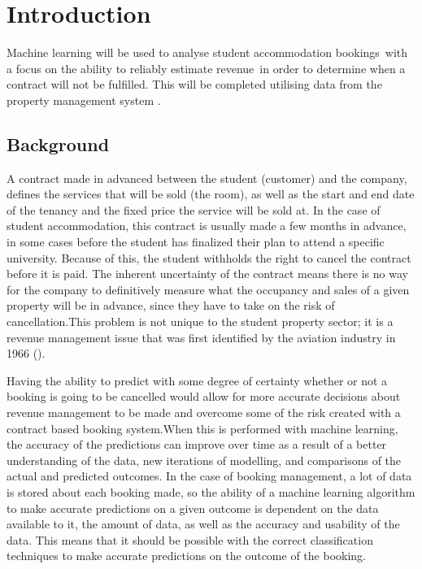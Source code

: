 \chapter{Introduction}

Machine learning will be used to analyse student accommodation bookings with a focus on the ability to reliably estimate revenue in order to determine when a contract will not be fulfilled. This will be completed utilising data from the property management system \cite{Jain2006IntellectualPerspective}.

\section{Background}

A contract made in advanced between the student (customer) and the company, defines the services that will be sold (the room), as well as the start and end date of the tenancy and the fixed price the service will be sold at. In the case of student accommodation, this contract is usually made a few months in advance, in some cases before the student has finalized their plan to attend a specific university. Because of this, the student withholds the right to cancel the contract before it is paid. The inherent uncertainty of the contract means there is no way for the company to definitively measure what the occupancy and sales of a given property will be in advance, since they have to take on the risk of cancellation.This problem is not unique to the student property sector; it is a revenue management issue that was first identified by the aviation industry in 1966 (\cite{Chiang2007AnResearch}).

\vspace{5mm}

Having the ability to predict with some degree of certainty whether or not a booking is going to be cancelled would allow for more accurate decisions about revenue management to be made and overcome some of the risk created with a contract based booking system.When this is performed with machine learning, the accuracy of the predictions can improve over time as a result of a better understanding of the data, new iterations of modelling, and comparisons of the actual and predicted outcomes. In the case of booking management, a lot of data is stored about each booking made, so the ability of a machine learning algorithm to make accurate predictions on a given outcome is dependent on the data available to it, the amount of data, as well as the accuracy and usability of the data. This means that it should be possible with the correct classification techniques to make accurate predictions on the outcome of the booking.


